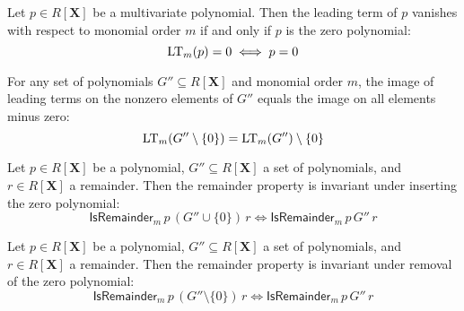         \begin{lemma}\label{lm_eq_zero_iff}
          \leanok
          Let $p \in R[\mathbf{X}]$ be a multivariate polynomial. Then the leading term of $p$
vanishes with respect to monomial order $m$ if and only if $p$ is the zero polynomial:
\[
  \operatorname{LT}_m(p) = 0 \iff p = 0
\]

        \end{lemma}

        \begin{lemma}\label{leadingTerm_image_sdiff_singleton_zero}
          \leanok
          For any set of polynomials $G'' \subseteq R[\mathbf{X}]$ and monomial order $m$,
the image of leading terms on the nonzero elements of $G''$ equals the image on all
elements minus zero:
\[
  \operatorname{LT}_m(G'' \setminus \{0\}) = \operatorname{LT}_m(G'') \setminus \{0\}
\]

        \end{lemma}

        \begin{lemma}\label{isRemainder_of_insert_zero_iff_isRemainder}
          \leanok
          Let $p \in R[\mathbf{X}]$ be a polynomial, $G'' \subseteq R[\mathbf{X}]$ a set of polynomials,
and $r \in R[\mathbf{X}]$ a remainder. Then the remainder property is invariant under
inserting the zero polynomial:
\[
  \mathsf{IsRemainder}_m\,p\,(G'' \cup \{0\})\,r \iff \mathsf{IsRemainder}_m\,p\,G''\,r
\]

        \end{lemma}

        \begin{lemma}\label{isRemainder_of_singleton_zero_iff_isRemainder}
          \leanok
          Let $p \in R[\mathbf{X}]$ be a polynomial, $G'' \subseteq R[\mathbf{X}]$ a set of polynomials,
and $r \in R[\mathbf{X}]$ a remainder. Then the remainder property is invariant under
removal of the zero polynomial:
\[
  \mathsf{IsRemainder}_m\,p\,(G'' \setminus \{0\})\,r \iff \mathsf{IsRemainder}_m\,p\,G''\,r
\]

        \end{lemma}

